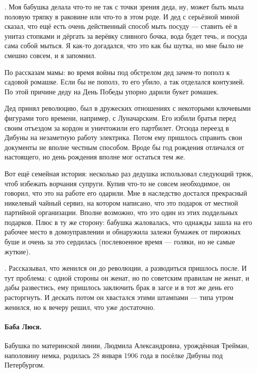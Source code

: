 \documentclass{book}
\begin{document}
.
Моя бабушка делала что-то не так с точки зрения деда, ну, может быть мыла половую тряпку в раковине или что-то в этом роде.
И дед с серьёзной миной сказал, что ещё есть очень действенный способ мыть посуду --- ставить её в унитаз стопками и дёргать за верёвку сливного бочка, вода будет течь, и посуда сама собой мыться.
Я как-то догадался, что это как бы шутка, но мне было не смешно совсем, и я запомнил.

\medskip

По рассказам мамы: во время войны под обстрелом дед зачем-то пополз к садовой ромашке.
Если бы не пополз, то его убило, а так отделался контузией.
По этой причине деду на День Победы упорно дарили букет ромашек.

Дед принял революцию, был в дружеских отношениях с некоторыми ключевыми фигурами того времени, например, с Луначарским.
Его избили братья перед своим отъездом за кордон и уничтожили его партбилет.
Отсюда переезд в Дибуны на незаметную работу электрика.
Потом ему пришлось справить свои документы не вполне честным способом.
Вроде бы год рождения отличался от настоящего, но день рождения вполне мог остаться тем же.

Вот ещё семейная история:
несколько раз дедушка использовал следующий трюк, чтоб избежать ворчания супруги.
Купив что-то не совсем необходимое, он говорил, что это на работе его одарили.
Мне в наследство достался прекрасный никелевый чайный сервиз, на котором написано, что это подарок от местной партийной организации.
Вполне возможно, что это один из этих поддельных подарков.
Плюс в ту же сторону: бабушка жаловалась, что однажды зашла на его рабочее место в домоуправлении и обнаружила залежи бумажек от пирожных буше и очень за это сердилась (послевоенное время --- голяки, но не самые жуткие).

.
Рассказывал, что женился он до революции, а разводиться пришлось после.
И тут проблема: с одной стороны он женат, но по советским правилам не женат,
и дабы развестись, ему пришлось заключить брак в загсе и в тот же день его расторгнуть.
И дескать потом он хвастался этими штампами ---
типа утром женился, но к вечеру решил, что уже достаточно.

\paragraph{Баба Люся.}
Бабушка по материнской линии, Людмила Александровна, урождённая Трейман, наполовину немка, родилась 28 января 1906 года в посёлке Дибуны под Петербургом.
\end{document}
